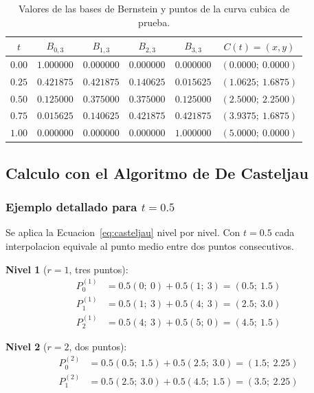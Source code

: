 \begin{table}[H]
\centering
\caption{Valores de las bases de Bernstein y puntos de la curva cubica de prueba.}
\label{tab:val_bases}
\begin{tabular}{c cccc c}
\toprule
\textbf{$t$} & \textbf{$B_{0,3}$} & \textbf{$B_{1,3}$} & \textbf{$B_{2,3}$} & \textbf{$B_{3,3}$} & \textbf{$C(t) = (x, y)$} \\
\midrule
$0.00$ & $1.000000$ & $0.000000$ & $0.000000$ & $0.000000$ & $(0.0000;\ 0.0000)$ \\
$0.25$ & $0.421875$ & $0.421875$ & $0.140625$ & $0.015625$ & $(1.0625;\ 1.6875)$ \\
$0.50$ & $0.125000$ & $0.375000$ & $0.375000$ & $0.125000$ & $(2.5000;\ 2.2500)$ \\
$0.75$ & $0.015625$ & $0.140625$ & $0.421875$ & $0.421875$ & $(3.9375;\ 1.6875)$ \\
$1.00$ & $0.000000$ & $0.000000$ & $0.000000$ & $1.000000$ & $(5.0000;\ 0.0000)$ \\
\bottomrule
\end{tabular}
\end{table}

\subsection{Calculo con el Algoritmo de De Casteljau}
\label{subsec:val_casteljau}

\subsubsection{Ejemplo detallado para $t = 0.5$}

Se aplica la Ecuacion~\ref{eq:casteljau} nivel por nivel. Con $t = 0.5$ cada interpolacion equivale al punto medio entre dos puntos consecutivos.

\textbf{Nivel 1} ($r = 1$, tres puntos):
\begin{align}
P_0^{(1)} & = 0.5(0;\ 0) + 0.5(1;\ 3) = (0.5;\ 1.5) \nonumber \\
P_1^{(1)} & = 0.5(1;\ 3) + 0.5(4;\ 3) = (2.5;\ 3.0) \nonumber \\
P_2^{(1)} &= 0.5(4;\ 3) + 0.5(5;\ 0) = (4.5;\ 1.5) \label{eq:val_nivel1}
\end{align}

\textbf{Nivel 2} ($r = 2$, dos puntos):
\begin{align}
P_0^{(2)} & = 0.5(0.5;\ 1.5) + 0.5(2.5;\ 3.0) = (1.5;\ 2.25) \nonumber \\
P_1^{(2)} &= 0.5(2.5;\ 3.0) + 0.5(4.5;\ 1.5) = (3.5;\ 2.25) \label{eq:val_nivel2}
\end{align}

